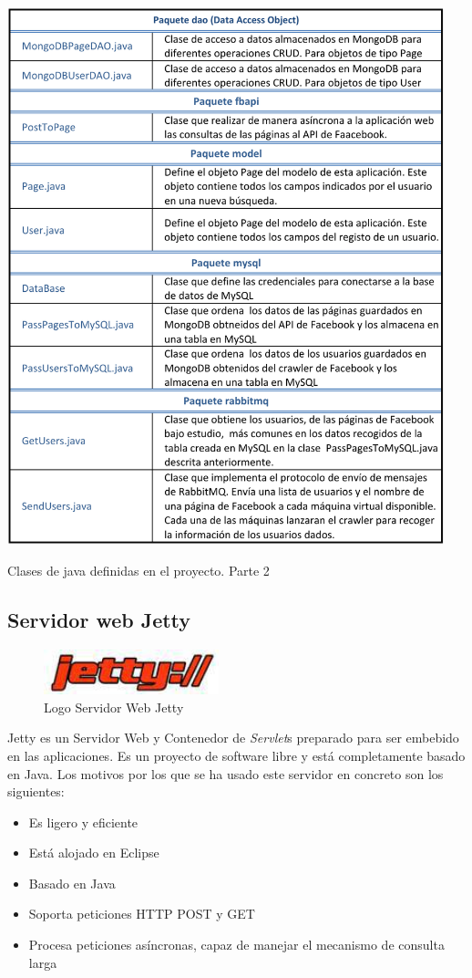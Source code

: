 \begin{table}[H]
	\centering
	\includegraphics[width=5in]{PDF/Clasesjava2.pdf}
	\caption{Clases de java definidas en el proyecto. Parte 2}
	\label{tab:clases2}
\end{table}
\subsection{Servidor web Jetty} \label{sec:1.2}
\begin{figure}[H]
\centering
\includegraphics[width=2in]{figuras/logoJetty.jpg}
\caption{Logo Servidor Web Jetty} \label{fig:logoJetty}
\end{figure}

Jetty es un Servidor Web y Contenedor de \textit{Servlet}s preparado para ser embebido en las aplicaciones. Es un proyecto de software libre y está completamente basado en Java. 
Los motivos por los que se ha usado este servidor en concreto son los siguientes: \\
\begin{itemize} \itemsep4pt \parskip0pt
\item Es ligero y eficiente
\item Está alojado en Eclipse
\item Basado en Java
\item Soporta peticiones HTTP POST y GET
\item Procesa peticiones asíncronas, capaz de manejar el mecanismo de consulta larga
\end{itemize}

